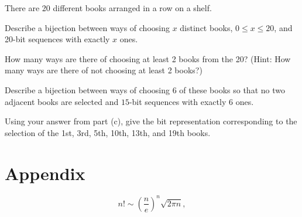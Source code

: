 \documentclass[11pt,twoside]{article}
\begin{document}
\instatements{\newpage}

\begin{problem}[4]
There are 20 different books arranged in a row on a shelf.
\begin{problemparts}
\problempart[1] 
Describe a bijection between ways of choosing $x$ distinct books, $0 \leq x \leq 20$, and 20-bit sequences with exactly $x$ ones.


\problempart[1]
How many ways are there of choosing at least 2 books from the 20? (Hint: How many ways are there of not choosing at least 2 books?)

\problempart[1]
Describe a
bijection between ways of choosing 6 of these books so that no two
adjacent books are selected and $15$-bit sequences with exactly 6 ones.


\problempart[1]
Using your answer from part (c), give the bit representation corresponding to the selection of the 1st, 3rd, 5th, 10th, 13th, and 19th books.


\end{problemparts}
\end{problem}




\instatements{\newpage}
\section*{Appendix}

\begin{lemma*}
\[
n! \sim \left(\frac{n}{e}\right)^n \sqrt{2 \pi n},
\]
\end{lemma*}
\end{document}

